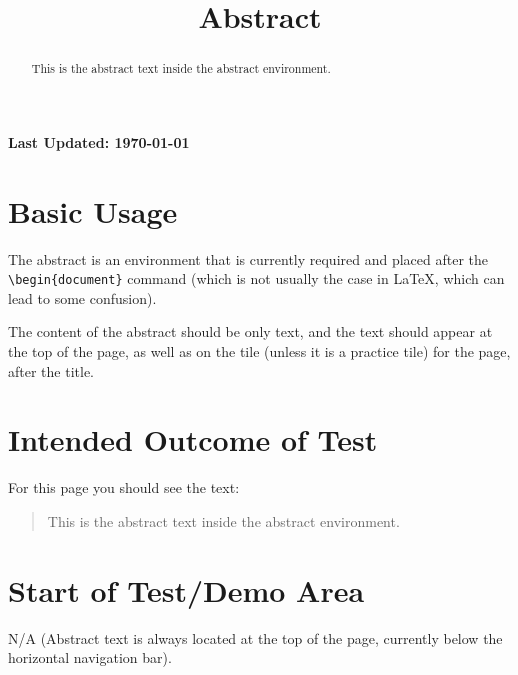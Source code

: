 \documentclass{ximera}
\title{Abstract}
\begin{document}
\begin{abstract}
    This is the abstract text inside the abstract environment.
\end{abstract}
\maketitle

{{\Huge \bfseries Last Updated: \today}} \\


\section{Basic Usage}

The abstract is an environment that is currently required and placed after the \verb|\begin{document}| command 
(which is not usually the case in LaTeX, which can lead to some confusion).

The content of the abstract should be only text, and the text should appear at the top of the page,
as well as on the tile (unless it is a practice tile) for the page, after the title.

\section{Intended Outcome of Test}

For this page you should see the text:
\begin{quote}
    This is the abstract text inside the abstract environment.
\end{quote}

\section{Start of Test/Demo Area}
N/A (Abstract text is always located at the top of the page, currently below the horizontal navigation bar).

\hrulefill
\end{document}
